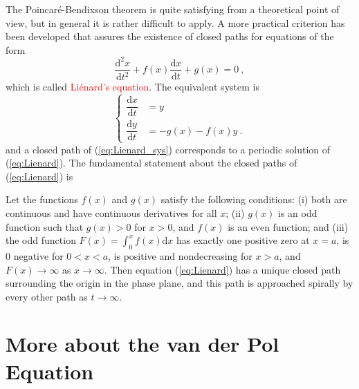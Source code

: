 \documentclass[12pt,a4paper]{article}
\newcommand{\dif}{\mathrm{d}}
\newcounter{theo}[section]\setcounter{theo}{0}
\begin{document}
The Poincar\'e-Bendixson theorem is quite satisfying from a theoretical point of view, but in general it is rather difficult to apply. A more practical criterion has been developed that assures the existence of closed paths for equations of the form
\begin{equation}
\dfrac{\dif^2 x}{\dif t^2} +f(x) \dfrac{\dif x}{\dif t} +g(x) = 0 ~,
\label{eq:Lienard}
\end{equation}
which is called \textcolor{red}{Li\'enard's equation}. The equivalent system is
\begin{equation}
\left\{
\begin{aligned}
\dfrac{\dif x}{\dif t} & = y \\
\dfrac{\dif y}{\dif t} & = -g(x) -f(x) y ~.
\label{eq:Lienard_sys}
\end{aligned}
\right.
\end{equation}
and a closed path of (\ref{eq:Lienard_sys}) corresponds to a periodic solution of (\ref{eq:Lienard}). The fundamental statement about the closed paths of (\ref{eq:Lienard}) is


\begin{tcolorbox}[colback=green!5,colframe=green!40!black,title= Theorem D (Li\'enard's Theorem) ]
Let the functions $f(x)$ and $g(x)$ satisfy the following conditions: (i) both are continuous and have continuous derivatives for all $x$;
(ii) $g(x)$ is an odd function such that $g(x) > 0$ for $x > 0$, and $f(x)$ is an even function; and (iii) the odd function $F(x) = \int_0^x f(x) \dif x$ has exactly one positive zero at $x=a$, is $0$ negative for $0 < x < a$, is positive and nondecreasing for $x > a$, and $F(x) \rightarrow \infty$ as $x \rightarrow \infty$. Then equation (\ref{eq:Lienard}) has a unique closed path surrounding the origin in the phase plane, and this path is approached spirally by every other path as $t \rightarrow \infty$.
\end{tcolorbox}









\section{More about the van der Pol Equation}
\cite{george1991differential, simmons2016differential} 
\end{document}

